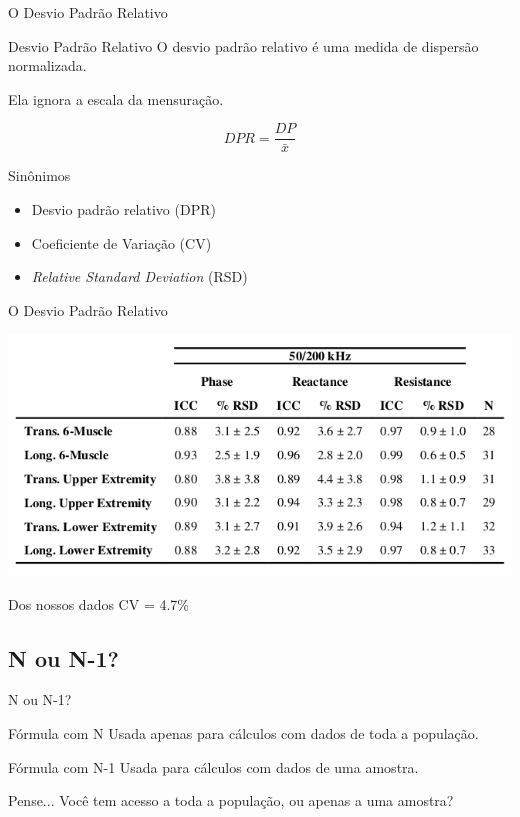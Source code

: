 \documentclass{beamer}
\begin{document}
\begin{frame}{O Desvio Padrão Relativo}
  \begin{block}{Desvio Padrão Relativo}
    O desvio padrão relativo é uma medida de dispersão \alert{normalizada}.

    \bigskip
    Ela ignora a escala da mensuração.

    $$DPR = \frac{DP}{\bar{x}}$$
  \end{block}
  \begin{exampleblock}{Sinônimos}
    \begin{itemize}
    \item Desvio padrão relativo (DPR)
    \item Coeficiente de Variação (CV)
    \item {\em Relative Standard Deviation} (RSD)
  \end{itemize}
  \end{exampleblock}
\end{frame}

\begin{frame}{O Desvio Padrão Relativo}
  \begin{center}
    \includegraphics[width=\textwidth]{Cap3/RSD1}
  \end{center}
  \begin{exampleblock}{Dos nossos dados}
    CV = 4.7\%
  \end{exampleblock}
\end{frame}

\subsection{N ou N-1?}

\begin{frame}{N ou N-1?}
  \begin{block}{Fórmula com N}
    Usada apenas para cálculos com dados de toda a população.
  \end{block}
  \begin{block}{Fórmula com N-1}
    Usada para cálculos com dados de uma amostra.
  \end{block}
  \begin{block}{Pense...}
      Você tem acesso a toda a população, ou apenas a uma amostra?
  \end{block}
\end{frame}
\end{document}
